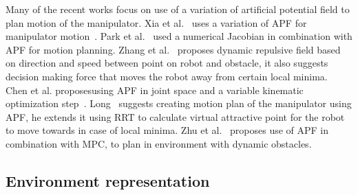 \documentclass[]{article}
\begin{document}
Many of the recent works focus on use of a variation of artificial potential field to plan motion of the manipulator. Xia et al.~\cite{c49} uses a variation of APF for manipulator motion~\cite{c49}. Park et al.~\cite{park2020trajectory} used a numerical Jacobian in combination with APF for motion planning. Zhang et al.~\cite{zhang2021obstacle} proposes dynamic repulsive field based on direction and speed between point on robot and obstacle, it also suggests decision making force that moves the robot away from certain local minima. Chen et al. proposesusing APF in joint space and a variable kinematic optimization step~\cite{c50}. Long~\cite{c44} suggests creating motion plan of the manipulator using APF, he extends it using RRT to calculate virtual attractive point for the robot to move towards in case of local minima. Zhu et al.~\cite{c48} proposes use of APF in combination with MPC, to plan in environment with dynamic obstacles.


\subsection{Environment representation}

\end{document}
